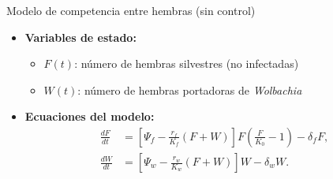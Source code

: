 \documentclass[10pt, aspectratio=169]{beamer}
\begin{document}
\begin{frame}{Modelo de competencia entre hembras (sin control)}
\begin{itemize}
    \item \textbf{Variables de estado:}
    \begin{itemize}
        \item $F(t)$: número de hembras silvestres (no infectadas)
        \item $W(t)$: número de hembras portadoras de \textit{Wolbachia}
    \end{itemize}
    \item \textbf{Ecuaciones del modelo:}
    \begin{align*}
        \frac{dF}{dt} &= \left[\Psi_f - \frac{r_f}{K_f}(F+W)\right] F 
                         \left(\frac{F}{K_0} - 1\right) - \delta_f F,\\
        \frac{dW}{dt} &= \left[\Psi_w - \frac{r_w}{K_w}(F+W)\right] W 
                         - \delta_w W.
    \end{align*}
\end{itemize}

\end{frame}
\end{document}
